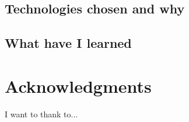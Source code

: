 \documentclass[hidelinks,11pt,a4paper,oneside,article]{memoir}
\begin{document}
\section{Technologies chosen and why}
\section{What have I learned}

\chapter{Acknowledgments}
I want to thank to... 




\begin{flushleft}
\begin{singlespacing}

\end{singlespacing}
\end{flushleft}

\label{LastPage}~


\clearpage
\appendix
\addappheadtotoc
\renewcommand{\thechapter}{\arabic{chapter}} 
\end{document}
